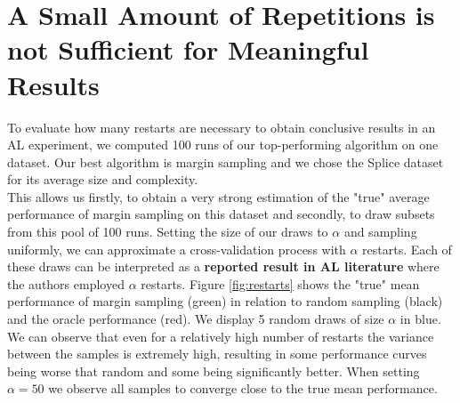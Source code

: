 \documentclass[]{article}
\begin{document}
\section{A Small Amount of Repetitions is not Sufficient for Meaningful Results}
\label{sec:restarts}
To evaluate how many restarts are necessary to obtain conclusive results in an AL experiment, we computed 100 runs of our top-performing algorithm on one dataset.
Our best algorithm is margin sampling and we chose the Splice dataset for its average size and complexity. \\
This allows us firstly, to obtain a very strong estimation of the "true" average performance of margin sampling on this dataset and secondly, to draw subsets from this pool of 100 runs.
Setting the size of our draws to $\alpha$ and sampling uniformly, we can approximate a cross-validation process with $\alpha$ restarts.
Each of these draws can be interpreted as a \textbf{reported result in AL literature} where the authors employed $\alpha$ restarts.
Figure \ref{fig:restarts} shows the "true" mean performance of margin sampling (green) in relation to random sampling (black) and the oracle performance (red).
We display 5 random draws of size $\alpha$ in blue.
We can observe that even for a relatively high number of restarts the variance between the samples is extremely high, resulting in some performance curves being worse that random and some being significantly better.
When setting $\alpha = 50$ we observe all samples to converge close to the true mean performance. 
\end{document}
